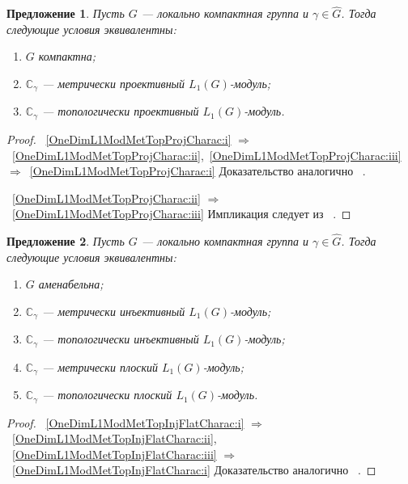 \documentclass{article}
\numberwithin{equation}{section}
\theoremstyle{plain}
\newtheorem{propos}{Предложение}
\theoremstyle{definition}
\newtheorem{proof}{Доказательство}\def\theproof{}
\begin{document}
\begin{fulltext}
\begin{propos}\label{OneDimL1ModMetTopProjCharac} Пусть $G$ --- локально
компактная группа и $\gamma\in\widehat{G}$. Тогда следующие условия
эквивалентны:
\begin{enumerate}[label = (\roman*)]
    \item $G$ компактна;\label{OneDimL1ModMetTopProjCharac:i}
    \item $\mathbb{C}_\gamma$ --- метрически проективный
	$L_1(G)$-модуль;\label{OneDimL1ModMetTopProjCharac:ii}

	\item $\mathbb{C}_\gamma$ --- топологически проективный
	$L_1(G)$-модуль.\label{OneDimL1ModMetTopProjCharac:iii}
\end{enumerate}
\end{propos}
\begin{proof}~\ref{OneDimL1ModMetTopProjCharac:i} $\Longrightarrow$
~\ref{OneDimL1ModMetTopProjCharac:ii},~\ref{OneDimL1ModMetTopProjCharac:iii}
$\Longrightarrow$~\ref{OneDimL1ModMetTopProjCharac:i} Доказательство аналогично
~\cite[теорема~4.2]{GravInjProjBanMod}. 

~\ref{OneDimL1ModMetTopProjCharac:ii} $\Longrightarrow$
~\ref{OneDimL1ModMetTopProjCharac:iii} Импликация следует из
~\cite[предложение~2.4]{NemGeomProjInjFlatBanMod}.
\end{proof}

\begin{propos}\label{OneDimL1ModMetTopInjFlatCharac} Пусть $G$ --- локально
компактная группа и $\gamma\in\widehat{G}$. Тогда следующие условия
эквивалентны:
\begin{enumerate}[label = (\roman*)]
    \item $G$ аменабельна;\label{OneDimL1ModMetTopInjFlatCharac:i}
    
	\item $\mathbb{C}_\gamma$ --- метрически инъективный
	$L_1(G)$-модуль;\label{OneDimL1ModMetTopInjFlatCharac:ii}
 
	\item $\mathbb{C}_\gamma$ --- топологически инъективный
	$L_1(G)$-модуль;\label{OneDimL1ModMetTopInjFlatCharac:iii}
 
	\item $\mathbb{C}_\gamma$ --- метрически плоский
	$L_1(G)$-модуль;\label{OneDimL1ModMetTopInjFlatCharac:iv}
 
	\item $\mathbb{C}_\gamma$ --- топологически плоский
	$L_1(G)$-модуль.\label{OneDimL1ModMetTopInjFlatCharac:v}
\end{enumerate}
\end{propos}
\begin{proof}~\ref{OneDimL1ModMetTopInjFlatCharac:i} $\Longrightarrow$
~\ref{OneDimL1ModMetTopInjFlatCharac:ii},
~\ref{OneDimL1ModMetTopInjFlatCharac:iii} $\Longrightarrow$
~\ref{OneDimL1ModMetTopInjFlatCharac:i} Доказательство аналогично
~\cite[теорема~4.5]{GravInjProjBanMod}.


\end{proof}
\end{fulltext}
\end{document}
